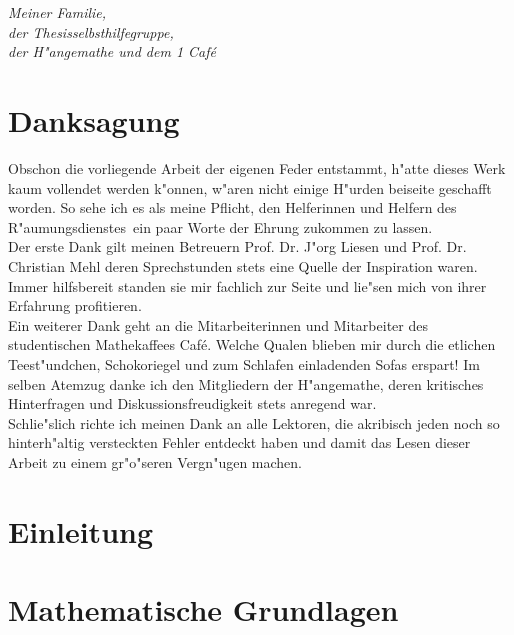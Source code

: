 \documentclass[11pt, twoside]{report}
\begin{document}
\newpage

\chapter*{}

\textit{Meiner Familie,\\
der Thesisselbsthilfegruppe,\\
der H"angemathe und dem 1 Caf\'e}

\chapter*{Danksagung}
Obschon die vorliegende Arbeit der eigenen Feder entstammt, h"atte dieses Werk kaum vollendet werden k"onnen,
w"aren nicht einige H"urden beiseite geschafft worden.
So sehe ich es als meine Pflicht, den Helferinnen und Helfern des \glqq R"aumungsdienstes\grqq\ ein paar Worte der Ehrung
zukommen zu lassen.\\

Der erste Dank gilt meinen Betreuern Prof. Dr. J"org Liesen und Prof. Dr. Christian Mehl deren Sprechstunden
stets eine Quelle der Inspiration waren. Immer hilfsbereit standen sie mir fachlich zur Seite und lie"sen mich von ihrer Erfahrung profitieren.\\

Ein weiterer Dank geht an die Mitarbeiterinnen und Mitarbeiter des studentischen Mathekaffees  Caf\'e\grqq. Welche Qualen blieben mir durch
die etlichen Teest"undchen, Schokoriegel und zum Schlafen einladenden Sofas erspart! Im selben Atemzug
danke ich den Mitgliedern der \glqq H"angemathe\grqq, deren kritisches Hinterfragen und Diskussionsfreudigkeit stets anregend war.\\

Schlie"slich richte ich meinen Dank an alle Lektoren, die akribisch jeden noch so hinterh"altig versteckten
Fehler entdeckt haben und damit das Lesen dieser Arbeit zu einem gr"o"seren Vergn"ugen machen.

\tableofcontents
\chapter*{}
\chapter{Einleitung}%


\chapter{Mathematische Grundlagen}
\label{chap2}
\end{document}
